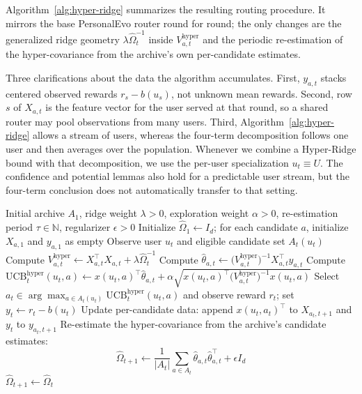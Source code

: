 \documentclass{article} %
\begin{document}
\label{sec:method-alg}

Algorithm~\ref{alg:hyper-ridge} summarizes the resulting routing procedure.
It mirrors the base PersonalEvo router round for round; the only changes are
the generalized ridge geometry $\lambda \widehat{\Omega}_t^{-1}$ inside
$V_{a,t}^{\mathrm{hyper}}$ and the periodic re-estimation of the
hyper-covariance from the archive's own per-candidate estimates.

Three clarifications about the data the algorithm accumulates. First, $y_{a,t}$ stacks centered observed rewards $r_s-b(u_s)$, not unknown mean rewards. Second, row $s$ of $X_{a,t}$ is the feature vector for the user served at that round, so a shared router may pool observations from many users. Third, Algorithm~\ref{alg:hyper-ridge} allows a stream of users, whereas the four-term decomposition follows one user and then averages over the population. Whenever we combine a Hyper-Ridge bound with that decomposition, we use the per-user specialization $u_t\equiv U$. The confidence and potential lemmas also hold for a predictable user stream, but the four-term conclusion does not automatically transfer to that setting.

\begin{algorithm}[t]
\caption{Hyper-Ridge PersonalEvo routing}
\label{alg:hyper-ridge}
\begin{algorithmic}[1]
\Require Initial archive $A_1$, ridge weight $\lambda > 0$, exploration
  weight $\alpha > 0$, re-estimation period $\tau \in \mathbb{N}$,
  regularizer $\epsilon > 0$
\State Initialize $\widehat{\Omega}_1 \gets I_d$; for each candidate $a$,
  initialize $X_{a,1}$ and $y_{a,1}$ as empty
  \State Observe user $u_t$ and eligible candidate set $A_t(u_t)$
    \State Compute
      $V_{a,t}^{\mathrm{hyper}} \gets X_{a,t}^\top X_{a,t}
        + \lambda \widehat{\Omega}_t^{-1}$
    \State Compute
      $\widehat{\theta}_{a,t} \gets
        \bigl( V_{a,t}^{\mathrm{hyper}} \bigr)^{-1}
        X_{a,t}^\top y_{a,t}$
    \State Compute
      $\mathrm{UCB}_t^{\mathrm{hyper}}(u_t, a) \gets
        x(u_t, a)^\top \widehat{\theta}_{a,t}
        + \alpha \sqrt{ x(u_t, a)^\top
          \bigl( V_{a,t}^{\mathrm{hyper}} \bigr)^{-1} x(u_t, a) }$
  \EndFor
  \State Select
    $a_t \in \arg\max_{a \in A_t(u_t)} \mathrm{UCB}_t^{\mathrm{hyper}}(u_t, a)$
    and observe reward $r_t$; set $y_t\gets r_t-b(u_t)$
  \State Update per-candidate data: append $x(u_t, a_t)^\top$ to
    $X_{a_t, t+1}$ and $y_t$ to $y_{a_t, t+1}$
    \State Re-estimate the hyper-covariance from the archive's
      candidate estimates:
      \[
        \widehat{\Omega}_{t+1} \gets
          \frac{1}{|A_t|} \sum_{a \in A_t}
          \widehat{\theta}_{a,t} \widehat{\theta}_{a,t}^\top
          + \epsilon I_d
      \]
  \Else
    \State $\widehat{\Omega}_{t+1} \gets \widehat{\Omega}_t$
  \EndIf
\EndFor
\end{algorithmic}
\end{algorithm}
\end{document}
